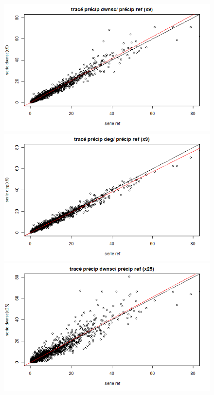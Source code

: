 \documentclass[a4paper,11pt]{article}
\begin{document}
\begin{figure}[!h]
	\begin{minipage}[b]{0.48\linewidth}
		\centering \includegraphics[scale=0.4]{images/pr_1_ds.png}
	\end{minipage}\hfill
	\begin{minipage}[b]{0.48\linewidth}	
		\centering \includegraphics[scale=0.4]{images/pr_1_dg.png}
	\end{minipage}
	\begin{minipage}[b]{0.48\linewidth}
		\centering \includegraphics[scale=0.4]{images/pr_2_ds.png}

\end{minipage}
\end{figure}
\end{document}
